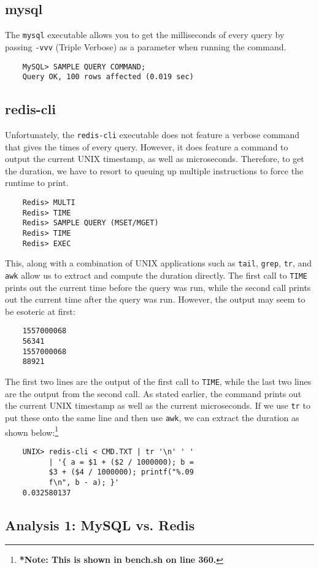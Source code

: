 \documentclass[letterpaper, 10 pt, conference]{ieeeconf}
\begin{document}
\subsection{mysql}
The \texttt{mysql} executable allows you to get the milliseconds of every query by passing \texttt{-vvv} (Triple Verbose) as a parameter when running the command.
\begin{verbatim}
    MySQL> SAMPLE QUERY COMMAND;
    Query OK, 100 rows affected (0.019 sec)
\end{verbatim}
\subsection{redis-cli}
Unfortunately, the \texttt{redis-cli} executable does not feature a verbose command that gives the times of every query. However, it does feature a command to output the current UNIX timestamp, as well as microseconds. Therefore, to get the duration, we have to resort to queuing up multiple instructions to force the runtime to print.
\begin{verbatim}
    Redis> MULTI
    Redis> TIME
    Redis> SAMPLE QUERY (MSET/MGET)
    Redis> TIME
    Redis> EXEC
\end{verbatim}
This, along with a combination of UNIX applications such as \texttt{tail}, \texttt{grep}, \texttt{tr}, and \texttt{awk} allow us to extract and compute the duration directly. The first call to \texttt{TIME} prints out the current time before the query was run, while the second call prints out the current time after the query was run. However, the output may seem to be esoteric at first:
\begin{verbatim}
    1557000068
    56341
    1557000068
    88921
\end{verbatim}
The first two lines are the output of the first call to \texttt{TIME}, while the last two lines are the output from the second call. As stated earlier, the command prints out the current UNIX timestamp as well as the current microseconds. If we use \texttt{tr} to put these onto the same line and then use \texttt{awk}, we can extract the duration as shown below:\footnote[*]{\textbf{*Note: This is shown in bench.sh on line 360.}}
\begin{verbatim}
    UNIX> redis-cli < CMD.TXT | tr '\n' ' '
          | '{ a = $1 + ($2 / 1000000); b = 
          $3 + ($4 / 1000000); printf("%.09
          f\n", b - a); }'
    0.032580137
\end{verbatim}


\subsection{Analysis 1: MySQL vs. Redis}
\end{document}
